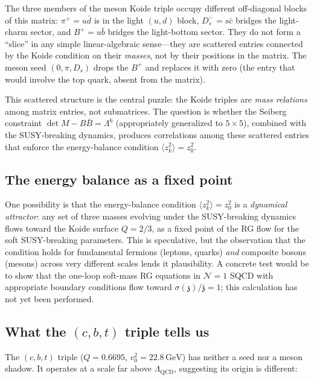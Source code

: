\documentclass[12pt,a4paper]{article}
\newcommand{\GeV}{\,\text{GeV}}
\newcommand{\zch}{\mathfrak{z}}
\begin{document}
The three members of the meson Koide triple occupy different 
off-diagonal blocks of this matrix: $\pi^+ = u\bar{d}$ is in the 
light $(u,d)$ block, $D_s^- = s\bar{c}$ bridges the light-charm 
sector, and $B^+ = u\bar{b}$ bridges the light-bottom sector. They 
do not form a ``slice'' in any simple linear-algebraic sense---they 
are scattered entries connected by the Koide condition on their 
\emph{masses}, not by their positions in the matrix. The meson seed 
$(0, \pi, D_s)$ drops the $B^+$ and replaces it with zero (the 
entry that would involve the top quark, absent from the matrix).

This scattered structure is the central puzzle: the Koide triples 
are \emph{mass relations} among matrix entries, not submatrices. 
The question is whether the Seiberg constraint 
$\det M - B\bar{B} = \Lambda^6$ (appropriately generalized to 
$5 \times 5$), combined with the SUSY-breaking dynamics, produces 
correlations among these scattered entries that enforce the 
energy-balance condition $\langle z_k^2\rangle = z_0^2$.

\subsection{The energy balance as a fixed point}

One possibility is that the energy-balance condition 
$\langle z_k^2\rangle = z_0^2$ is a \emph{dynamical attractor}: 
any set of three masses evolving under the SUSY-breaking dynamics 
flows toward the Koide surface $Q = 2/3$, as a fixed point of the 
RG flow for the soft SUSY-breaking parameters. This is speculative, 
but the observation that the condition holds for fundamental fermions 
(leptons, quarks) \emph{and} composite bosons (mesons) across very 
different scales lends it plausibility. A concrete test would be to 
show that the one-loop soft-mass RG equations in $\mathcal{N}=1$ 
SQCD with appropriate boundary conditions flow toward 
$\sigma(\zch)/\bar{\zch} = 1$; this calculation has not yet been 
performed.

\subsection{What the $(c,b,t)$ triple tells us}

The $(c,b,t)$ triple ($Q = 0.6695$, $v_0^2 = 22.8\GeV$) has 
neither a seed nor a meson shadow. It operates at a scale far 
above $\Lambda_{\text{QCD}}$, suggesting its origin is different:
\end{document}
